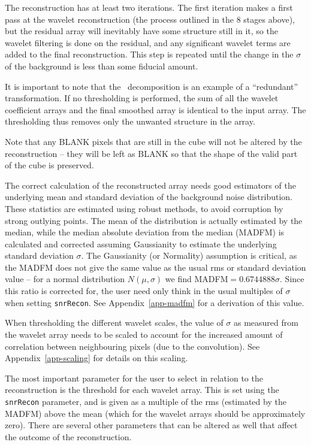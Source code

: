 The reconstruction has at least two iterations. The first iteration
makes a first pass at the wavelet reconstruction (the process outlined
in the 8 stages above), but the residual array will inevitably have
some structure still in it, so the wavelet filtering is done on the
residual, and any significant wavelet terms are added to the final
reconstruction. This step is repeated until the change in the $\sigma$
of the background is less than some fiducial amount.

It is important to note that the \atrous\ decomposition is an example
of a ``redundant'' transformation. If no thresholding is performed,
the sum of all the wavelet coefficient arrays and the final smoothed
array is identical to the input array. The thresholding thus removes
only the unwanted structure in the array.

Note that any BLANK pixels that are still in the cube will not be
altered by the reconstruction -- they will be left as BLANK so that
the shape of the valid part of the cube is preserved.


The correct calculation of the reconstructed array needs good
estimators of the underlying mean and standard deviation of the
background noise distribution. These statistics are estimated using
robust methods, to avoid corruption by strong outlying points. The
mean of the distribution is actually estimated by the median, while
the median absolute deviation from the median (MADFM) is calculated
and corrected assuming Gaussianity to estimate the underlying standard
deviation $\sigma$. The Gaussianity (or Normality) assumption is
critical, as the MADFM does not give the same value as the usual rms
or standard deviation value -- for a normal distribution
$N(\mu,\sigma)$ we find MADFM$=0.6744888\sigma$. Since this ratio is
corrected for, the user need only think in the usual multiples of
$\sigma$ when setting \texttt{snrRecon}. See Appendix~\ref{app-madfm}
for a derivation of this value.

When thresholding the different wavelet scales, the value of $\sigma$
as measured from the wavelet array needs to be scaled to account for
the increased amount of correlation between neighbouring pixels (due
to the convolution). See Appendix~\ref{app-scaling} for details on
this scaling.


The most important parameter for the user to select in relation to the
reconstruction is the threshold for each wavelet array. This is set
using the \texttt{snrRecon} parameter, and is given as a multiple of
the rms (estimated by the MADFM) above the mean (which for the wavelet
arrays should be approximately zero). There are several other
parameters that can be altered as well that affect the outcome of the
reconstruction.

